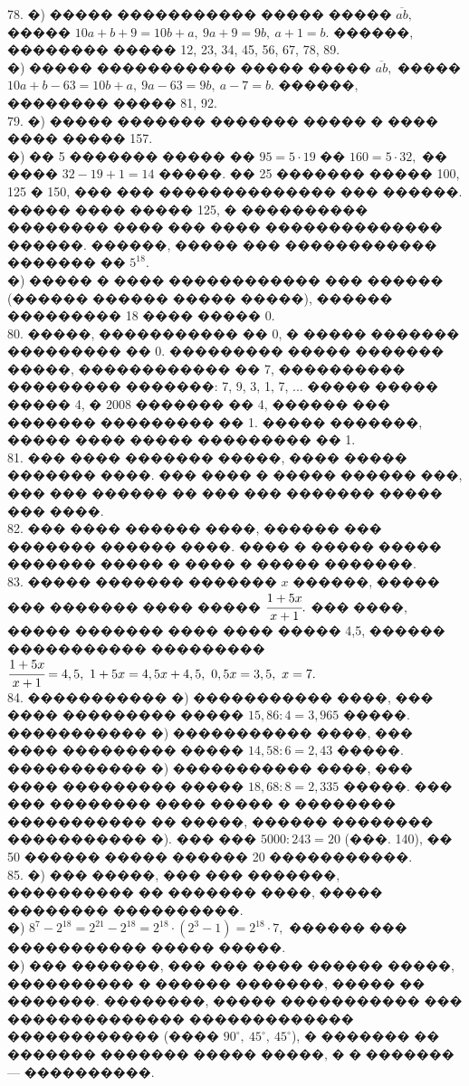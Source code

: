 \documentclass[12pt]{article}
\begin{document}
78. �) ����� ����������� ����� ����� $\overline{ab},$ ����� $10a+b+9=10b+a,\ 9a+9=9b,\ a+1=b.$ ������, �������� ����� 12, 23, 34, 45, 56, 67, 78, 89.\\
�) ����� ����������� ����� ����� $\overline{ab},$ ����� $10a+b-63=10b+a,\ 9a-63=9b,\ a-7=b.$ ������, �������� ����� 81, 92.\\
79. �) ����� ������� ������� ����� � ���� ���� ����� 157.\\
�) �� 5 ������� ����� �� $95=5\cdot19$ �� $160=5\cdot32,$ �� ���� $32-19+1=14$ �����. �� 25 ������� ����� 100, 125 � 150, ��� ��� �������������� ��� ������. ����� ���� ����� 125, � ���������� �������� ���� ��� ���� �������������� ������. ������, ����� ��� ������������ ������� �� $5^{18}.$\\
�) ����� � ���� ������������ ��� ������ (������ ������ ����� �����), ������ ��������� 18 ���� ����� 0.\\
80. �����, ����������� �� 0, � ����� ������� ��������� �� 0. ��������� ����� ������� �����, ������������ �� 7, ���������� ��������� �������: 7, 9, 3, 1, 7, ...
����� ����� ����� 4, � 2008 ������� �� 4, ������ ��� ������� ��������� �� 1. ����� �������, ����� ���� ����� ��������� �� 1.\\
81. ��� ���� ������� �����, ���� ����� ������� ����. ��� ���� � ����� ������ ���, ��� ��� ������ �� ��� ��� ������� ����� ��� ����.\\
82. ��� ���� ������ ����, ������ ��� ������� ������ ����. ���� � ����� ����� ������� ����� � ���� � ����� �������.\\
83. ����� ������� ������� $x$ ������, ����� ��� ������� ���� ����� $\cfrac{1+5x}{x+1}.$ ��� ����, ����� ������� ���� ���� ����� 4,5, ������ ����������� ���������
$\cfrac{1+5x}{x+1}=4,5,\ 1+5x=4,5x+4,5,\ 0,5x=3,5,\ x=7.$\\
84. ����������� �) ����������� ����, ��� ���� ��������� ����� $15,86:4=3,965$ �����. ����������� �) ����������� ����, ��� ���� ��������� ����� $14,58:6=2,43$ �����. ����������� �) ����������� ����, ��� ���� ��������� ����� $18,68:8=2,335$ �����. ��� ��� �������� ���� ����� � �������� ����������� �� �����, ������ �������� ����������� �).  ��� ��� $5000:243=20$ (���. 140), �� 50 ������ ����� ������ 20 �����������.\\
85. �) ��� �����, ��� ��� �������, ���������� �� ������� ����, ����� �������� ����������.\\
�) $8^7-2^{18}=2^{21}-2^{18}=2^{18}\cdot(2^3-1)=2^{18}\cdot7,$ ������ ��� ����������� ����� �����.\\
�) ��� �������, ��� ��� ���� ������ �����, ���������� � ������ �������, ����� �� �������. ��������, ����� ����������� ��� �������������� ������������� ������������ (���� $90^\circ,\ 45^\circ,\ 45^\circ$), � ������� �� ������� ������� ����� �����, � � ������� --- ����������.\\
\end{document}
